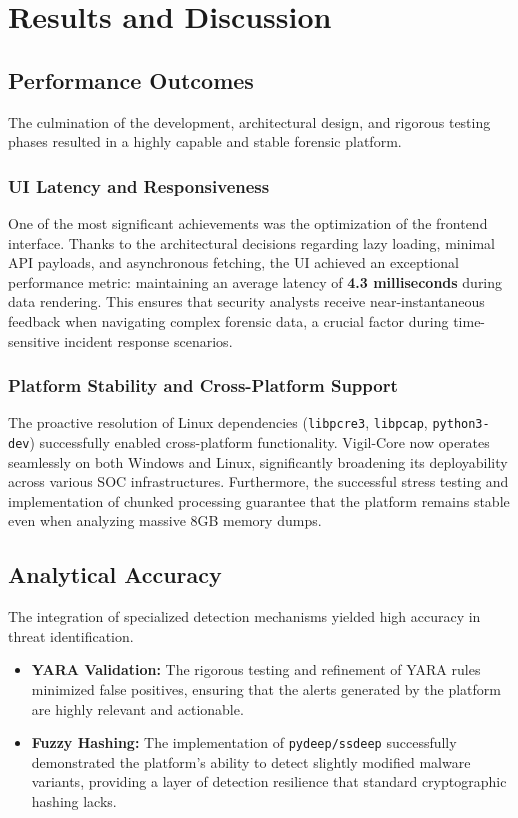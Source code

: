 \chapter{Results and Discussion}

\section{Performance Outcomes}
The culmination of the development, architectural design, and rigorous testing phases resulted in a highly capable and stable forensic platform. 

\subsection{UI Latency and Responsiveness}
One of the most significant achievements was the optimization of the frontend interface. Thanks to the architectural decisions regarding lazy loading, minimal API payloads, and asynchronous fetching, the UI achieved an exceptional performance metric: maintaining an average latency of \textbf{4.3 milliseconds} during data rendering. This ensures that security analysts receive near-instantaneous feedback when navigating complex forensic data, a crucial factor during time-sensitive incident response scenarios.

\subsection{Platform Stability and Cross-Platform Support}
The proactive resolution of Linux dependencies (\texttt{libpcre3}, \texttt{libpcap}, \texttt{python3-dev}) successfully enabled cross-platform functionality. Vigil-Core now operates seamlessly on both Windows and Linux, significantly broadening its deployability across various SOC infrastructures. Furthermore, the successful stress testing and implementation of chunked processing guarantee that the platform remains stable even when analyzing massive 8GB memory dumps.

\section{Analytical Accuracy}
The integration of specialized detection mechanisms yielded high accuracy in threat identification.
\begin{itemize}
    \item \textbf{YARA Validation:} The rigorous testing and refinement of YARA rules minimized false positives, ensuring that the alerts generated by the platform are highly relevant and actionable.
    \item \textbf{Fuzzy Hashing:} The implementation of \texttt{pydeep/ssdeep} successfully demonstrated the platform's ability to detect slightly modified malware variants, providing a layer of detection resilience that standard cryptographic hashing lacks.
\end{itemize}

